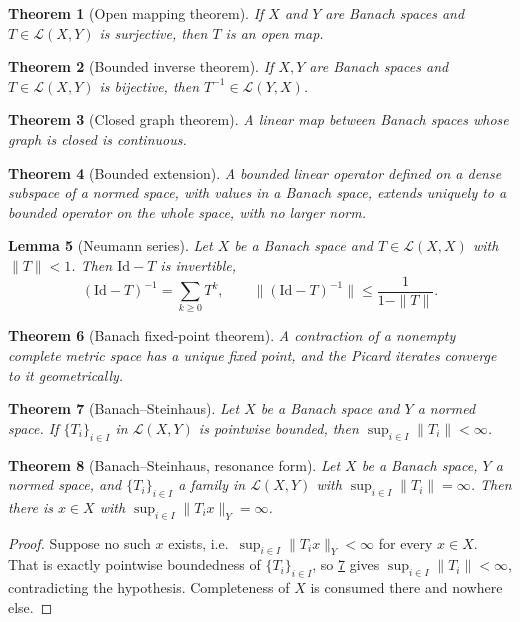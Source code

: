 \documentclass[a4paper]{report}
\theoremstyle{plain}
\newtheorem{theorem}{Theorem}[chapter]
\newtheorem{lemma}[theorem]{Lemma}
\theoremstyle{definition}
\theoremstyle{remark}
\begin{document}
\begin{theorem}[Open mapping theorem]
  \label{thm_open_mapping}
  If $X$ and $Y$ are Banach spaces and $T \in \mathcal{L}(X,Y)$ is surjective, then $T$ is
  an open map.
\end{theorem}


\begin{theorem}[Bounded inverse theorem]
  \label{thm_bounded_inverse}
  If $X,Y$ are Banach spaces and $T \in \mathcal{L}(X,Y)$ is bijective, then
  $T^{-1} \in \mathcal{L}(Y,X)$.
\end{theorem}


\begin{theorem}[Closed graph theorem]
  \label{thm_closed_graph}
  A linear map between Banach spaces whose graph is closed is continuous.
\end{theorem}


\begin{theorem}[Bounded extension]
  \label{thm_blt}
  A bounded linear operator defined on a dense subspace of a normed space, with values in
  a Banach space, extends uniquely to a bounded operator on the whole space, with no
  larger norm.
\end{theorem}




\begin{lemma}[Neumann series]
  \label{lem_neumann}
  Let $X$ be a Banach space and $T \in \mathcal{L}(X,X)$ with $\|T\| < 1$.  Then
  $\mathrm{Id}-T$ is invertible,
  \[
    (\mathrm{Id}-T)^{-1} = \sum_{k \ge 0} T^k, \qquad
    \|(\mathrm{Id}-T)^{-1}\| \le \frac{1}{1-\|T\|}.
  \]
\end{lemma}



\begin{theorem}[Banach fixed-point theorem]
  \label{thm_banach_fixed_point}
  A contraction of a nonempty \emph{complete metric space} has a unique fixed point, and
  the Picard iterates converge to it geometrically.
\end{theorem}


\begin{theorem}[Banach--Steinhaus]
  \label{thm_banach_steinhaus}
  Let $X$ be a Banach space and $Y$ a normed space.  If $\{T_i\}_{i \in I}$ in
  $\mathcal{L}(X,Y)$ is pointwise bounded, then $\sup_{i \in I}\|T_i\| < \infty$.
\end{theorem}


\begin{theorem}[Banach--Steinhaus, resonance form]
  \label{thm_resonance}
  Let $X$ be a Banach space, $Y$ a normed space, and $\{T_i\}_{i \in I}$ a family in
  $\mathcal{L}(X,Y)$ with $\sup_{i \in I}\|T_i\| = \infty$.  Then there is $x \in X$ with
  $\sup_{i \in I}\|T_ix\|_Y = \infty$.
\end{theorem}
\begin{proof}
  Suppose no such $x$ exists, i.e.\ $\sup_{i \in I}\|T_ix\|_Y < \infty$ for every
  $x \in X$.  That is exactly pointwise boundedness of $\{T_i\}_{i \in I}$, so
  \cref{thm_banach_steinhaus} gives $\sup_{i \in I}\|T_i\| < \infty$, contradicting the
  hypothesis.  Completeness of $X$ is consumed there and nowhere else.
\end{proof}
\end{document}

